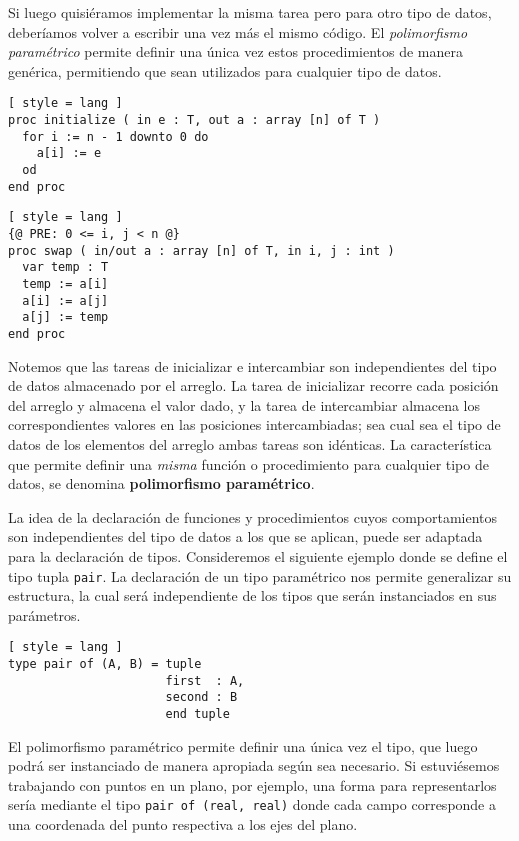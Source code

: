Si luego quisiéramos implementar la misma tarea pero para otro tipo de datos, deberíamos volver a escribir una vez más el mismo código.
El \textit{polimorfismo paramétrico} permite definir una única vez estos procedimientos de manera genérica, permitiendo que sean utilizados para cualquier tipo de datos.

\begin{lstlisting}[ style = lang ]
proc initialize ( in e : T, out a : array [n] of T )
  for i := n - 1 downto 0 do
    a[i] := e
  od
end proc
\end{lstlisting}

\begin{lstlisting}[ style = lang ]
{@ PRE: 0 <= i, j < n @}
proc swap ( in/out a : array [n] of T, in i, j : int )
  var temp : T
  temp := a[i]
  a[i] := a[j]
  a[j] := temp
end proc
\end{lstlisting}

Notemos que las tareas de inicializar e intercambiar son independientes del tipo de datos almacenado por el arreglo.
La tarea de inicializar recorre cada posición del arreglo y almacena el valor dado, y la tarea de intercambiar almacena los correspondientes valores en las posiciones intercambiadas; sea cual sea el tipo de datos de los elementos del arreglo ambas tareas son idénticas.
La característica que permite definir una \textit{misma} función o procedimiento para cualquier tipo de datos, se denomina \textbf{polimorfismo paramétrico}.

La idea de la declaración de funciones y procedimientos cuyos comportamientos son independientes del tipo de datos a los que se aplican, puede ser adaptada para la declaración de tipos.
Consideremos el siguiente ejemplo donde se define el tipo tupla \lstinline[style = lang]{pair}.
La declaración de un tipo paramétrico nos permite generalizar su estructura, la cual será independiente de los tipos que serán instanciados en sus parámetros.

\begin{lstlisting}[ style = lang ]
type pair of (A, B) = tuple
                      first  : A,
                      second : B
                      end tuple
\end{lstlisting}

El polimorfismo paramétrico permite definir una única vez el tipo, que luego podrá ser instanciado de manera apropiada según sea necesario.
Si estuviésemos trabajando con puntos en un plano, por ejemplo, una forma para representarlos sería mediante el tipo \lstinline[style = lang]{pair of (real, real)} donde cada campo corresponde a una coordenada del punto respectiva a los ejes del plano.

